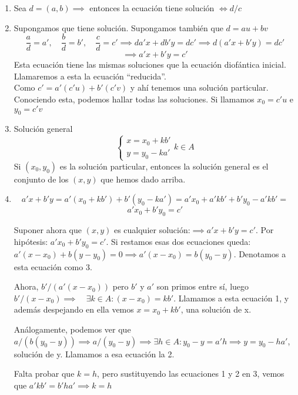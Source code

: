\documentclass[11pt, a4paper, titlepage]{article}
\makeatletter
\renewenvironment{proof}[1][\proofname] {\vspace{-15pt}\par\pushQED{\qed}\normalfont\topsep6\p@\@plus6\p@\relax\trivlist\item[\hskip\labelsep\it#1\@addpunct{.}]\ignorespaces}{\popQED\endtrivlist\@endpefalse}
\theoremstyle{theorem-style}
\theoremstyle{definition-style}
\theoremstyle{remark-style}
\theoremstyle{example-style}
\newenvironment{nlist}
{\begin{enumerate}
\renewcommand\labelenumi{(\emph{\roman{enumi})}}}
{\end{enumerate}}
\makeatother
\begin{document}
\begin{nlist}
	\item Sea $d=(a,b)\implies$ entonces la ecuación tiene solución $\iff d/c$
	\item Supongamos que tiene solución. Supongamos también que $d= au+bv$
\[
\frac{a}{d}= a',\quad \frac{b}{d}=b',\quad \frac{c}{d}=c'\implies da'x + db'y = dc' \implies d(a'x+b'y)=dc'\]
\[ \implies a'x+b'y = c'
\]
Esta ecuación tiene las mismas soluciones que la ecuación diofántica inicial. Llamaremos a esta la ecuación ``reducida''.\\


Como $c'= a'(c'u)+b'(c'v)$ y ahí tenemos una solución particular. Conociendo esta, podemos hallar todas las soluciones. Si llamamos $x_0 =c'u$ e $y_0 = c'v$

\item Solución general \[\begin{cases}
	x = x_0 +kb'\\
	y= y_0 -ka'
\end{cases} k\in A\]
Si $(x_0,y_0)$ es la solución particular, entonces la solución general es el conjunto de los $(x,y)$ que hemos dado arriba.
\\
\begin{proof}[Demostración de iii)]

\[
a'x + b'y = a'(x_0 +kb') + b'(y_0 - ka') = a'x_0 + a'kb' + b'y_0 - a'kb' = 
\]
\[
a'x_0 +b'y_0 = c'
\]

Suponer ahora que $(x,y)$ es cualquier solución:$\implies a'x +b'y = c'$. Por hipótesis: $a'x_0 +b'y_0 = c'$. Si restamos esas dos ecuaciones queda: $a'(x-x_0) +b(y-y_0) = 0 \implies a'(x-x_0) = b(y_0-y)$. Denotamos a esta ecuación como 3.

Ahora, $b'/(a'(x-x_0))$ pero $b'$ y $a'$ son primos entre sí, luego $b'/(x-x_0)\implies \quad \exists k \in A : (x-x_0) = kb'$. Llamamos a esta ecuación 1, y además despejando en ella vemos $x = x_0 + kb'$, una solución de x.

Análogamente, podemos ver que $a/(b(y_0-y)) \implies a/(y_0-y) \implies \exists h \in A: y_0 -y = a'h \implies y = y_0 - ha'$, solución de y. Llamamos a esa ecuación la 2.

Falta probar que $k = h$, pero sustituyendo las ecuaciones 1 y 2 en 3, vemos que $a'kb'  = b'ha' \implies k = h$
	
\end{proof}

\end{nlist}
\end{document}
